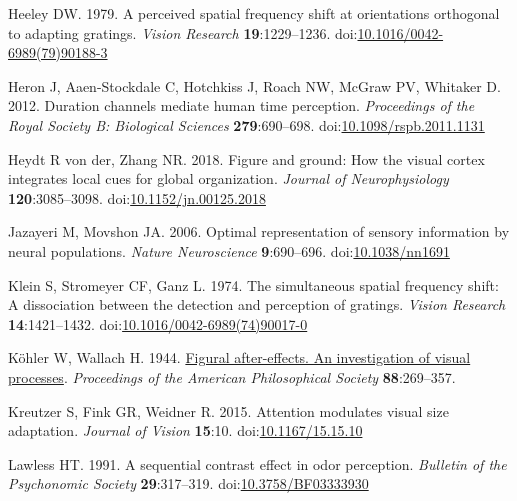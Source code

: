 \documentclass[
]{article}
\newlength{\cslhangindent}
\newlength{\cslentryspacingunit} %
\newenvironment{CSLReferences}[2] %
 {%
  \setlength{\parindent}{0pt}
  \ifodd #1
  \let\oldpar\par
  \def\par{\hangindent=\cslhangindent\oldpar}
  \fi
  \setlength{\parskip}{#2\cslentryspacingunit}
 }%
 {}
\begin{document}
\begin{CSLReferences}{1}{0}
\leavevmode{}%
Heeley DW. 1979. A perceived spatial frequency shift at orientations orthogonal to adapting gratings. \emph{Vision Research} \textbf{19}:1229--1236. doi:\href{https://doi.org/10.1016/0042-6989(79)90188-3}{10.1016/0042-6989(79)90188-3}

\leavevmode{}%
Heron J, Aaen-Stockdale C, Hotchkiss J, Roach NW, McGraw PV, Whitaker D. 2012. Duration channels mediate human time perception. \emph{Proceedings of the Royal Society B: Biological Sciences} \textbf{279}:690--698. doi:\href{https://doi.org/10.1098/rspb.2011.1131}{10.1098/rspb.2011.1131}

\leavevmode{}%
Heydt R von der, Zhang NR. 2018. Figure and ground: How the visual cortex integrates local cues for global organization. \emph{Journal of Neurophysiology} \textbf{120}:3085--3098. doi:\href{https://doi.org/10.1152/jn.00125.2018}{10.1152/jn.00125.2018}

\leavevmode{}%
Jazayeri M, Movshon JA. 2006. Optimal representation of sensory information by neural populations. \emph{Nature Neuroscience} \textbf{9}:690--696. doi:\href{https://doi.org/10.1038/nn1691}{10.1038/nn1691}

\leavevmode{}%
Klein S, Stromeyer CF, Ganz L. 1974. The simultaneous spatial frequency shift: A dissociation between the detection and perception of gratings. \emph{Vision Research} \textbf{14}:1421--1432. doi:\href{https://doi.org/10.1016/0042-6989(74)90017-0}{10.1016/0042-6989(74)90017-0}

\leavevmode{}%
Köhler W, Wallach H. 1944. \href{http://www.jstor.org/stable/985451}{Figural after-effects. An investigation of visual processes}. \emph{Proceedings of the American Philosophical Society} \textbf{88}:269--357.

\leavevmode{}%
Kreutzer S, Fink GR, Weidner R. 2015. Attention modulates visual size adaptation. \emph{Journal of Vision} \textbf{15}:10. doi:\href{https://doi.org/10.1167/15.15.10}{10.1167/15.15.10}

\leavevmode{}%
Lawless HT. 1991. A sequential contrast effect in odor perception. \emph{Bulletin of the Psychonomic Society} \textbf{29}:317--319. doi:\href{https://doi.org/10.3758/BF03333930}{10.3758/BF03333930}


\end{CSLReferences}
\end{document}
